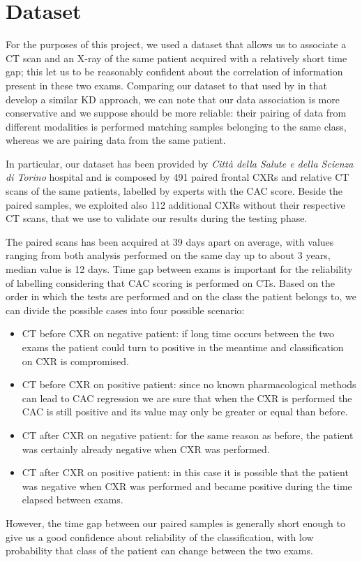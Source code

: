 \chapter{Dataset}\label{sec:dataset}

For the purposes of this project, we used a dataset that allows us to associate a CT scan and an X-ray of the same patient acquired with a relatively short time gap; this let us to be reasonably confident about the correlation of information present in these two exams.
Comparing our dataset to that used by \citeauthor{zhang2023distilling} in \cite{zhang2023distilling} that develop a similar KD approach, we can note that our data association is more conservative and we suppose should be more reliable: their pairing of data from different modalities is performed matching samples belonging to the same class, whereas we are pairing data from the same patient.

In particular, our dataset has been provided by \emph{Città della Salute e della Scienza di Torino} hospital and is composed by 491 paired frontal CXRs and relative CT scans of the same patients, labelled by experts with the CAC score.
Beside the paired samples, we exploited also 112 additional CXRs without their respective CT scans, that we use to validate our results during the testing phase.

The paired scans has been acquired at 39 days apart on average, with values ranging from both analysis performed on the same day up to about 3 years, median value is 12 days.
Time gap between exams is important for the reliability of labelling considering that CAC scoring is performed on CTs.
Based on the order in which the tests are performed and on the class the patient belongs to, we can divide the possible cases into four possible scenario:
\begin{itemize}
    \item CT before CXR on negative patient: if long time occurs between the two exams the patient could turn to positive in the meantime and classification on CXR is compromised.
    \item CT before CXR on positive patient: since no known pharmacological methods can lead to CAC regression \cite{Czaja-Ziolkowska2022-pd} we are sure that when the CXR is performed the CAC is still positive and its value may only be greater or equal than before. 
    \item CT after CXR on negative patient: for the same reason as before, the patient was certainly already negative when CXR was performed.
    \item CT after CXR on positive patient: in this case it is possible that the patient was negative when CXR was performed and became positive during the time elapsed between exams.
\end{itemize}
However, the time gap between our paired samples is generally short enough to give us a good confidence about reliability of the classification, with low probability that class of the patient can change between the two exams.

